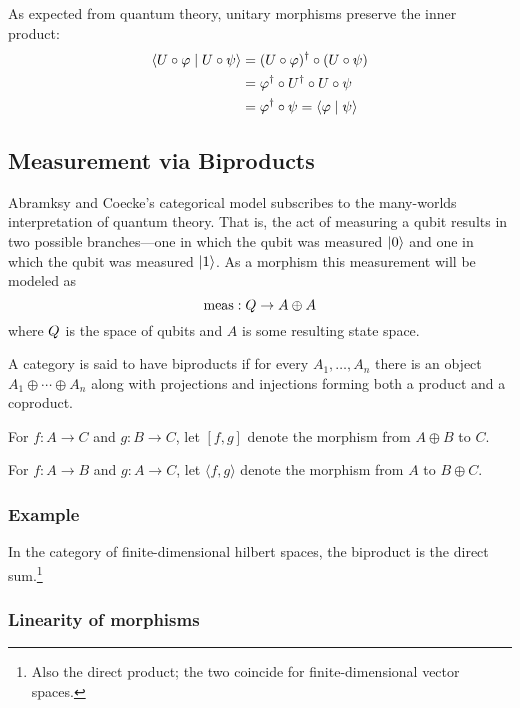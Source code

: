 As expected from quantum theory, unitary morphisms preserve the inner product:
\begin{align*}
    \Braket{U\circ \varphi \mid U \circ \psi}
    &= (U \circ \varphi)^\dagger \circ (U \circ \psi) \\
    &= \varphi^\dagger \circ U^\dagger \circ U \circ \psi \\
    &= \varphi^\dagger \circ \psi = \Braket{\varphi \mid \psi}
\end{align*}


\subsection{Measurement via Biproducts}

Abramksy and Coecke's categorical model subscribes to the many-worlds interpretation of quantum
theory. That is, the act of measuring a qubit results in two possible branches---one in 
which the qubit was measured $\Ket{0}$ and one in which the qubit was measured $\Ket{1}$.
As a morphism this measurement will be modeled as
\[ \operatorname{meas} : Q \rightarrow A \oplus A \]
where $Q$ is the space of qubits and $A$ is some resulting state space.

\begin{definition}
    A category is said to have biproducts if for every $A_1,\ldots,A_n$
    there is an object $A_1 \oplus \cdots \oplus A_n$ along with
    projections and injections forming both a product and a coproduct.
    
    For $f : A \rightarrow C$ and $g : B \rightarrow C$, let $[f,g]$
    denote the morphism from $A \oplus B$ to $C$.

    For $f : A \rightarrow B$ and $g : A \rightarrow C$, let $\langle f,g\rangle$ denote
    the morphism from $A$ to $B \oplus C$.
\end{definition}

\subsubsection*{Example} In the category of finite-dimensional hilbert spaces, the 
biproduct is the direct sum.\footnote{Also the direct product; the two coincide
for finite-dimensional vector spaces.}

\subsubsection*{Linearity of morphisms}

